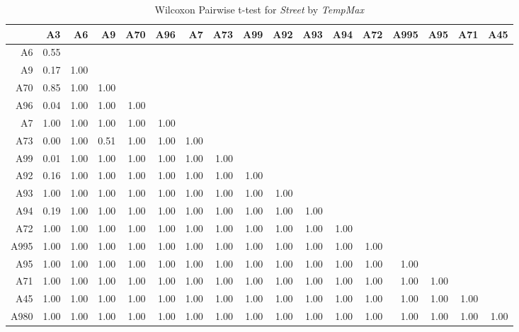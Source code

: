 \begin{table}[ht]
	\tiny
	\setlength{\tabcolsep}{4pt}
	\centering
	\begin{tabular}{rrrrrrrrrrrrrrrrr}
		\toprule
		& A3 & A6 & A9 & A70 & A96 & A7 & A73 & A99 & A92 & A93 & A94 & A72 & A995 & A95 & A71 & A45 \\ 
		\midrule
		A6 & 0.55 &  &  &  &  &  &  &  &  &  &  &  &  &  &  &  \\ 
		A9 & 0.17 & 1.00 &  &  &  &  &  &  &  &  &  &  &  &  &  &  \\ 
		A70 & 0.85 & 1.00 & 1.00 &  &  &  &  &  &  &  &  &  &  &  &  &  \\ 
		A96 & 0.04 & 1.00 & 1.00 & 1.00 &  &  &  &  &  &  &  &  &  &  &  &  \\ 
		A7 & 1.00 & 1.00 & 1.00 & 1.00 & 1.00 &  &  &  &  &  &  &  &  &  &  &  \\ 
		A73 & 0.00 & 1.00 & 0.51 & 1.00 & 1.00 & 1.00 &  &  &  &  &  &  &  &  &  &  \\ 
		A99 & 0.01 & 1.00 & 1.00 & 1.00 & 1.00 & 1.00 & 1.00 &  &  &  &  &  &  &  &  &  \\ 
		A92 & 0.16 & 1.00 & 1.00 & 1.00 & 1.00 & 1.00 & 1.00 & 1.00 &  &  &  &  &  &  &  &  \\ 
		A93 & 1.00 & 1.00 & 1.00 & 1.00 & 1.00 & 1.00 & 1.00 & 1.00 & 1.00 &  &  &  &  &  &  &  \\ 
		A94 & 0.19 & 1.00 & 1.00 & 1.00 & 1.00 & 1.00 & 1.00 & 1.00 & 1.00 & 1.00 &  &  &  &  &  &  \\ 
		A72 & 1.00 & 1.00 & 1.00 & 1.00 & 1.00 & 1.00 & 1.00 & 1.00 & 1.00 & 1.00 & 1.00 &  &  &  &  &  \\ 
		A995 & 1.00 & 1.00 & 1.00 & 1.00 & 1.00 & 1.00 & 1.00 & 1.00 & 1.00 & 1.00 & 1.00 & 1.00 &  &  &  &  \\ 
		A95 & 1.00 & 1.00 & 1.00 & 1.00 & 1.00 & 1.00 & 1.00 & 1.00 & 1.00 & 1.00 & 1.00 & 1.00 & 1.00 &  &  &  \\ 
		A71 & 1.00 & 1.00 & 1.00 & 1.00 & 1.00 & 1.00 & 1.00 & 1.00 & 1.00 & 1.00 & 1.00 & 1.00 & 1.00 & 1.00 &  &  \\ 
		A45 & 1.00 & 1.00 & 1.00 & 1.00 & 1.00 & 1.00 & 1.00 & 1.00 & 1.00 & 1.00 & 1.00 & 1.00 & 1.00 & 1.00 & 1.00 &  \\ 
		A980 & 1.00 & 1.00 & 1.00 & 1.00 & 1.00 & 1.00 & 1.00 & 1.00 & 1.00 & 1.00 & 1.00 & 1.00 & 1.00 & 1.00 & 1.00 & 1.00 \\
		\bottomrule
	\end{tabular}
	\caption{Wilcoxon Pairwise t-test for \textit{Street} by \textit{TempMax}}
\end{table}

